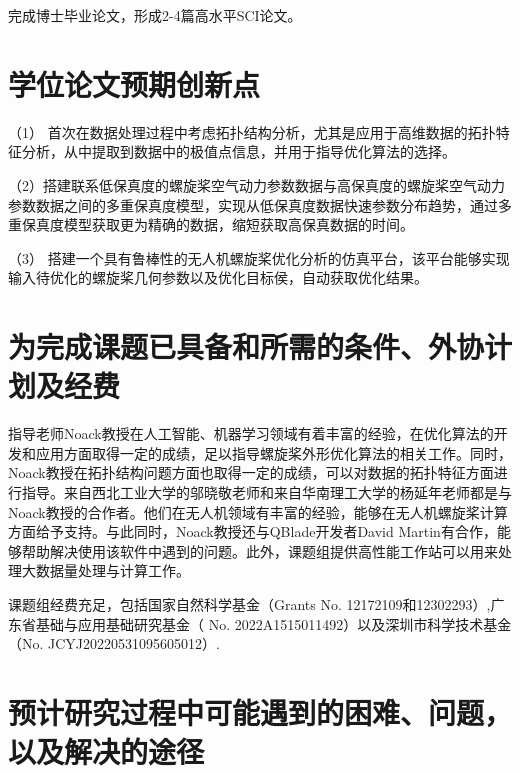 完成博士毕业论文，形成2-4篇高水平SCI论文。

\vspace{0.8em}
\section{学位论文预期创新点}\label{Sec: innovations}
\vspace{0.8em}

（1） 首次在数据处理过程中考虑拓扑结构分析，尤其是应用于高维数据的拓扑特征分析，从中提取到数据中的极值点信息，并用于指导优化算法的选择。

（2）搭建联系低保真度的螺旋桨空气动力参数数据与高保真度的螺旋桨空气动力参数数据之间的多重保真度模型，实现从低保真度数据快速参数分布趋势，通过多重保真度模型获取更为精确的数据，缩短获取高保真数据的时间。
    
    
（3） 搭建一个具有鲁棒性的无人机螺旋桨优化分析的仿真平台，该平台能够实现输入待优化的螺旋桨几何参数以及优化目标侯，自动获取优化结果。


\vspace{0.8em}
\section{为完成课题已具备和所需的条件、外协计划及经费}\label{Sec: support}
\vspace{0.8em}

指导老师Noack教授在人工智能、机器学习领域有着丰富的经验，在优化算法的开发和应用方面取得一定的成绩\cite{LiA2022jfm,Shaqarin_PSOE}，足以指导螺旋桨外形优化算法的相关工作。同时，Noack教授在拓扑结构问题方面也取得一定的成绩，可以对数据的拓扑特征方面进行指导\cite{Fernex2020prf}。来自西北工业大学的邬晓敬老师和来自华南理工大学的杨延年老师都是与Noack教授的合作者。他们在无人机领域有丰富的经验，能够在无人机螺旋桨计算方面给予支持。与此同时，Noack教授还与QBlade开发者David Martin有合作，能够帮助解决使用该软件中遇到的问题。此外，课题组提供高性能工作站可以用来处理大数据量处理与计算工作。

课题组经费充足，包括国家自然科学基金（Grants No. 
12172109和12302293）,广东省基础与应用基础研究基金（ No. 2022A1515011492）以及深圳市科学技术基金（No. JCYJ20220531095605012）.

\vspace{0.8em}
\section{预计研究过程中可能遇到的困难、问题，以及解决的途径}\label{Sec: problems}
\vspace{0.8em}

